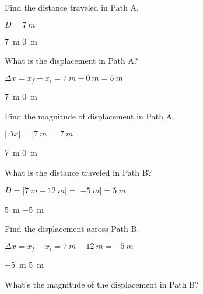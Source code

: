 \documentclass[answers]{exam}
\begin{document}
\begin{questions}
\question \label{Q1}
Find the distance traveled in Path A.

\ifprintanswers
{\color{red} 
$D = \boxed{\SI{7}{m}}$
}

\smallskip
\fi

\begin{randomizechoices}
    \correctchoice \SI{7}{m}
    \choice \SI{0}{m}
\end{randomizechoices}

\question
What is the displacement in Path A?

\ifprintanswers
{\color{red} 
$\Delta x = x_f - x_i = \SI{7}{m} - \SI{0}{m} = \boxed{\SI{5}{m}}$
}

\smallskip
\fi

\begin{randomizechoices}
    \correctchoice \SI{7}{m}
    \choice \SI{0}{m}
\end{randomizechoices}

\question 
Find the magnitude of displacement in Path A.

\ifprintanswers
{\color{red} 
$|\Delta x| = |\SI{7}{m}| = \boxed{\SI{7}{m}}$
}

\smallskip
\fi

\begin{randomizechoices}
    \correctchoice \SI{7}{m}
    \choice \SI{0}{m}
\end{randomizechoices}


\question
What is the distance traveled in Path B?

\ifprintanswers
{\color{red} 
$D = \left|\SI{7}{m} - \SI{12}{m}\right| = \left|-\SI{5}{m}\right| = \boxed{\SI{5}{m}}$
}

\smallskip
\fi

\begin{randomizechoices}
    \correctchoice \SI{5}{m}
    \choice \SI{-5}{m}
\end{randomizechoices}


\question 
Find the displacement across Path B.

\ifprintanswers
{\color{red} 
$\Delta x = x_f - x_i = \SI{7}{m} - \SI{12}{m} = \boxed{\SI{-5}{m}}$
}

\smallskip
\fi

\begin{randomizechoices}
    \correctchoice \SI{-5}{m}
    \choice \SI{5}{m}
\end{randomizechoices}


\question
What's the magnitude of the displacement in Path B?


\end{questions}
\end{document}
